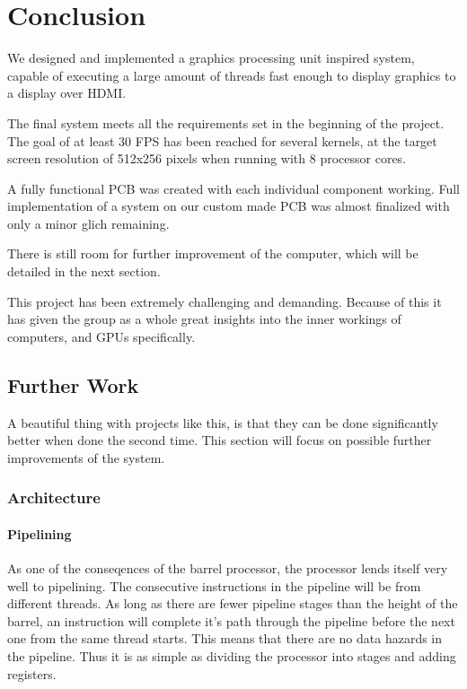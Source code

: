 \documentclass[../main/report.tex]{subfiles}
\begin{document}
\chapter{Conclusion}

We designed and implemented a graphics processing unit inspired system,
capable of executing a large amount of threads fast enough to display graphics to a display over HDMI.

The final system meets all the requirements set in the beginning of the project.
The goal of at least 30 FPS has been reached for several kernels,
at the target screen resolution of 512x256 pixels when running with 8 processor cores.

A fully functional PCB was created with each individual component working.
Full implementation of a system on our custom made PCB was almost finalized with only a minor glich remaining.

There is still room for further improvement of the computer, which will be detailed in the next section.

This project has been extremely challenging and demanding.
Because of this it has given the group as a whole great insights into the inner workings of computers,
and GPUs specifically.

\section{Further Work}

A beautiful thing with projects like this, is that they can be done significantly better when done the second time.
This section will focus on possible further improvements of the system.

\subsection{Architecture}
\subsubsection*{Pipelining}
As one of the conseqences of the barrel processor, the processor lends itself very well to pipelining.
The consecutive instructions in the pipeline will be from different threads.
As long as there are fewer pipeline stages than the height of the barrel, an instruction will complete it's path through the pipeline before the next one from the same thread starts.
This means that there are no data hazards in the pipeline. Thus it is as simple as dividing the processor into stages and adding registers.
\end{document}
